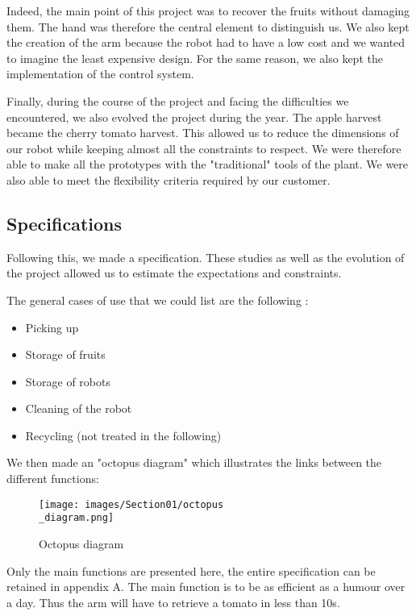 \bigbreak
Indeed, the main point of this project was to recover the fruits without damaging them. The hand was therefore the central element to distinguish us. We also kept the creation of the arm because the robot had to have a low cost and we wanted to imagine the least expensive design. For the same reason, we also kept the implementation of the control system. 

\bigbreak
Finally, during the course of the project and facing the difficulties we encountered, we also evolved the project during the year. The apple harvest became the cherry tomato harvest. This allowed us to reduce the dimensions of our robot while keeping almost all the constraints to respect. We were therefore able to make all the prototypes with the "traditional" tools of the plant. We were also able to meet the flexibility criteria required by our customer. 

\subsection{Specifications}

\hspace{\parindent} Following this, we made a specification. These studies as well as the evolution of the project allowed us to estimate the expectations and constraints. 

\bigbreak
\noindent The general cases of use that we could list are the following : 
\begin{itemize}[noitemsep]
    \item Picking up
    \item Storage of fruits
    \item Storage of robots
    \item Cleaning of the robot
    \item Recycling (not treated in the following)
\end{itemize}

We then made an "octopus diagram" which illustrates the links between the different functions: 
\begin{figure}[ht]
    \centering
    \texttt{[image: images/Section01/octopus\\\_diagram.png]}
    \caption{Octopus diagram}
    \label{fig:mesh1}
\end{figure}

\bigbreak
Only the main functions are presented here, the entire specification can be retained in appendix A. The main function is to be as efficient as a humour over a day. Thus the arm will have to retrieve a tomato in less than 10s. 

